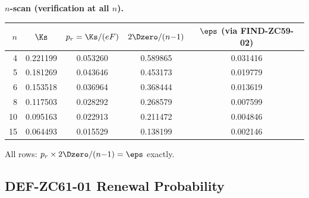 \documentclass[12pt, a4paper]{article}
\begin{document}
\begin{derivedbox}[title={FIND-ZC61-01: Renewal Decomposition
  $\eps = p_r \cdot 2\Dzero/(n{-}1)$ ($R_0$, Exact)}]
\textbf{$n$-scan (verification at all $n$).}
\begin{center}
{\small\renewcommand{\arraystretch}{1.25}
\begin{tabular}{@{}rcccc@{}}
\toprule
$n$ & $\Ks$ & $p_r = \Ks/(eF)$ & $2\Dzero/(n{-}1)$ & $\eps$ (via FIND-ZC59-02) \\
\midrule
4  & 0.221199 & 0.053260 & 0.589865 & 0.031416 \\
5  & 0.181269 & 0.043646 & 0.453173 & 0.019779 \\
6  & 0.153518 & 0.036964 & 0.368444 & 0.013619 \\
8  & 0.117503 & 0.028292 & 0.268579 & 0.007599 \\
10 & 0.095163 & 0.022913 & 0.211472 & 0.004846 \\
15 & 0.064493 & 0.015529 & 0.138199 & 0.002146 \\
\bottomrule
\end{tabular}
}
\end{center}
All rows: $p_r \times 2\Dzero/(n{-}1) = \eps$ exactly.
\end{derivedbox}

\subsection{DEF-ZC61-01 \quad Renewal Probability}
\label{sec:def01}

\end{document}
